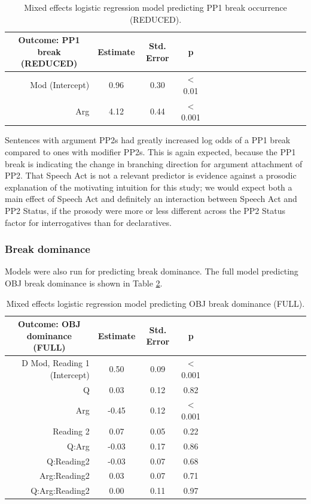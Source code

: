 \documentclass[12pt,oneside]{book}
\begin{document}
\begin{table}[!h]

\caption{\label{tab:pp1Mod}Mixed effects logistic regression model predicting PP1 break occurrence (REDUCED).}
\centering
\begin{tabular}{rcccrcccrcccrccc}
\toprule
\multicolumn{1}{c}{Outcome: PP1 break (REDUCED)} & \multicolumn{1}{c}{Estimate} & \multicolumn{1}{c}{Std. Error} & \multicolumn{1}{c}{p}\\
\midrule
Mod (Intercept) & 0.96 & 0.30 & < 0.01\\
Arg & 4.12 & 0.44 & < 0.001\\
\bottomrule
\end{tabular}
\end{table}

Sentences with argument PP2s had greatly increased log odds of a PP1 break compared to ones with modifier PP2s. This is again expected, because the PP1 break is indicating the change in branching direction for argument attachment of PP2. That Speech Act is not a relevant predictor is evidence against a prosodic explanation of the motivating intuition for this study; we would expect both a main effect of Speech Act and definitely an interaction between Speech Act and PP2 Status, if the prosody were more or less different across the PP2 Status factor for interrogatives than for declaratives.

\hypertarget{break-dominance-1}{%
\subsubsection{Break dominance}\label{break-dominance-1}}

Models were also run for predicting break dominance. The full model predicting OBJ break dominance is shown in Table \ref{tab:fodom}.

\begin{table}[!h]

\caption{\label{tab:fodom}Mixed effects logistic regression model predicting OBJ break dominance (FULL).}
\centering
\begin{tabular}{rcccrcccrcccrccc}
\toprule
\multicolumn{1}{c}{Outcome: OBJ dominance (FULL)} & \multicolumn{1}{c}{Estimate} & \multicolumn{1}{c}{Std. Error} & \multicolumn{1}{c}{p}\\
\midrule
D Mod, Reading 1 (Intercept) & 0.50 & 0.09 & < 0.001\\
Q & 0.03 & 0.12 & 0.82\\
Arg & -0.45 & 0.12 & < 0.001\\
Reading 2 & 0.07 & 0.05 & 0.22\\
Q:Arg & -0.03 & 0.17 & 0.86\\
\addlinespace
Q:Reading2 & -0.03 & 0.07 & 0.68\\
Arg:Reading2 & 0.03 & 0.07 & 0.71\\
Q:Arg:Reading2 & 0.00 & 0.11 & 0.97\\
\bottomrule
\end{tabular}
\end{table}
\end{document}
